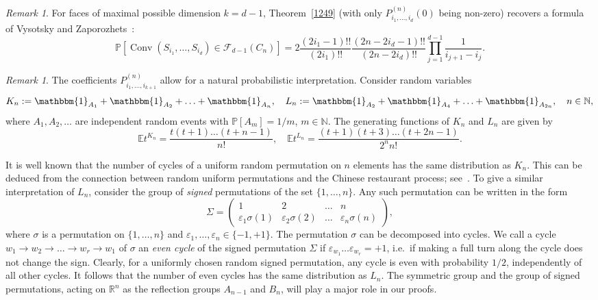 \documentclass[12pt, reqno]{amsart}
\theoremstyle{plain}
\theoremstyle{definition}
\theoremstyle{remark}
\newtheorem{remark}[theorem]{Remark}
\begin{document}
\begin{remark}
For faces of maximal possible dimension $k = d-1$, Theorem~\ref{1249} (with only $P^{(n)}_{i_1,\ldots,i_d}(0)$ being non-zero) recovers a formula of Vysotsky and Zaporozhets~\cite{vysotsky_zaporozhets}:
$$
{\mathbb{P}}[{\mathop{\mathrm{Conv}}\nolimits}(S_{i_1},\ldots,S_{i_{d}}) \in \mathcal F_{d-1}(C_n)] = 2 \frac{(2i_1-1)!!}{(2i_1)!!}\frac{(2n - 2i_d-1)!!}{(2n - 2i_d)!!} \prod_{j=1}^{d-1} \frac{1}{i_{j+1} - i_j}.
$$
\end{remark}
\begin{remark}
The coefficients $P_{i_1,\ldots,i_{k+1}}^{(n)}$  allow for a natural probabilistic interpretation. Consider random variables
$$
K_n := {\mathbbm{1}}_{A_1} + {\mathbbm{1}}_{A_2}+ \ldots + {\mathbbm{1}}_{A_n}, \quad L_n := {\mathbbm{1}}_{A_2} + {\mathbbm{1}}_{A_4} + \ldots + {\mathbbm{1}}_{A_{2n}}, \quad n\in{\mathbb{N}},
$$
where $A_1,A_2,\ldots$ are independent random events with ${\mathbb{P}}[A_m] = 1/m$, $m\in{\mathbb{N}}$.  The generating functions of $K_n$ and $L_n$ are given by
$$
{\mathbb E} t^{K_n} = \frac{t(t+1)\ldots (t+n-1)}{n!}, \quad
{\mathbb E} t^{L_n} = \frac{(t+1)(t+3)\ldots (t+2n-1)}{2^n n!}.
$$

It is well known that the number of cycles  of a uniform random permutation on $n$ elements has the same distribution as $K_n$. This can be deduced from the connection between random uniform permutations and the Chinese restaurant process; see~\cite[Section~3.1]{pitman_book}. To give a similar interpretation of $L_n$, consider the group of \emph{signed} permutations of the set $\{1,\ldots,n\}$. Any such permutation can be written in the form
$$
\Sigma=
\begin{pmatrix}
1 & 2 &  \ldots  & n \\
{\varepsilon}_1 \sigma(1) & {\varepsilon}_2\sigma(2) &  \ldots &  {\varepsilon}_n \sigma(n)
\end{pmatrix},
$$
where $\sigma$ is a permutation on $\{1,\ldots,n\}$ and ${\varepsilon}_1,\ldots,{\varepsilon}_n\in \{-1,+1\}$. The permutation $\sigma$ can be decomposed into cycles. We call a cycle $w_1 \to w_2\to \ldots \to w_r\to w_1$ of $\sigma$ an \emph{even cycle} of the signed permutation $\Sigma$ if ${\varepsilon}_{w_1}\ldots {\varepsilon}_{w_r} = +1$, i.e.\ if making a full turn along the cycle does not change the sign.
Clearly, for a uniformly chosen random signed permutation, any cycle is even with probability $1/2$, independently of all other cycles. It follows that the number of even cycles has the same distribution as $L_n$. The symmetric group and the group of signed permutations, acting on ${\mathbb{R}}^n$ as the reflection groups $A_{n-1}$ and $B_n$, will play a major role in our proofs.


\end{remark}
\end{document}
